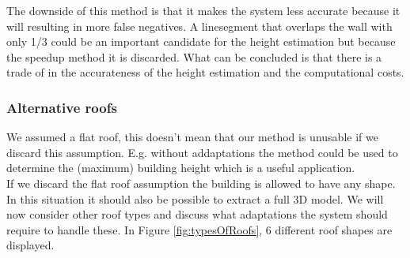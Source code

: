 The downside of this method is that it makes the system less accurate because it
will resulting in more false negatives. A linesegment that overlaps the wall with only 1/3 could be an
important candidate for the height estimation but because the speedup method it is discarded.
What can be concluded is that there is a trade of in the accurateness of the
height estimation and the computational costs.


\subsubsection{Alternative roofs}

We assumed a flat roof, this doesn't mean that our method is unusable if
we discard this assumption.
E.g. without addaptations the method could be used to determine the (maximum)
building height which is a useful application.\\

If we discard the flat roof assumption the building is allowed to have any
shape. In this situation it should also be possible to extract a
full 3D model.  We will now consider other roof types and discuss what
adaptations the system should require to handle these.  In Figure
\ref{fig:typesOfRoofs}, 6 different roof shapes are displayed.\\

